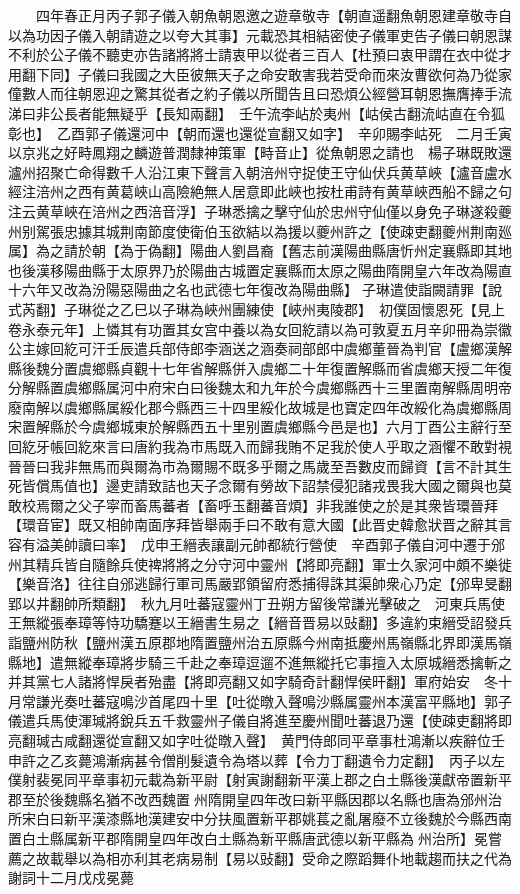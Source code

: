 　　四年春正月丙子郭子儀入朝魚朝恩邀之遊章敬寺【朝直遥翻魚朝恩建章敬寺自以為功因子儀入朝請遊之以夸大其事】元載恐其相結密使子儀軍吏告子儀曰朝恩謀不利於公子儀不聽吏亦告諸將將士請衷甲以從者三百人【杜預曰衷甲謂在衣中從才用翻下同】子儀曰我國之大臣彼無天子之命安敢害我若受命而來汝曹欲何為乃從家僮數人而往朝恩迎之驚其從者之約子儀以所聞告且曰恐煩公經營耳朝恩撫膺捧手流涕曰非公長者能無疑乎【長知兩翻】　壬午流李岾於夷州【岵侯古翻流岵直在令狐彰也】　乙酉郭子儀還河中【朝而還也還從宣翻又如字】　辛卯賜李岵死　二月壬寅以京兆之好畤鳳翔之麟遊普潤隸神策軍【畤音止】從魚朝恩之請也　楊子琳既敗還瀘州招聚亡命得數千人沿江東下聲言入朝涪州守捉使王守仙伏兵黄草峽【瀘音盧水經注涪州之西有黄葛峽山高險絶無人居意即此峽也按杜甫詩有黄草峽西船不歸之句注云黄草峽在涪州之西涪音浮】子琳悉擒之擊守仙於忠州守仙僅以身免子琳遂殺夔州别駕張忠據其城荆南節度使衛伯玉欲結以為援以夔州許之【使疎吏翻夔州荆南廵属】為之請於朝【為于偽翻】陽曲人劉昌裔【舊志前漢陽曲縣唐忻州定襄縣即其地也後漢移陽曲縣于太原界乃於陽曲古城置定襄縣而太原之陽曲隋開皇六年改為陽直十六年又改為汾陽惡陽曲之名也武德七年復改為陽曲縣】子琳遣使詣闕請罪【說式芮翻】子琳從之乙巳以子琳為峽州團練使【峽州夷陵郡】　初僕固懷恩死【見上卷永泰元年】上憐其有功置其女宫中養以為女回紇請以為可敦夏五月辛卯冊為崇徽公主嫁回紇可汗壬辰遣兵部侍郎李涵送之涵奏祠部郎中虞鄉董晉為判官【盧鄉漢解縣後魏分置虞鄉縣貞觀十七年省解縣併入虞鄉二十年復置解縣而省虞鄉天授二年復分解縣置虞鄉縣属河中府宋白曰後魏太和九年於今虞鄉縣西十三里置南解縣周明帝廢南解以虞鄉縣属綏化郡今縣西三十四里綏化故城是也寶定四年改綏化為虞鄉縣周宋置解縣於今虞鄉城東於解縣西五十里别置虞鄉縣今邑是也】六月丁酉公主辭行至回紇牙帳回紇來言曰唐約我為市馬既入而歸我賄不足我於使人乎取之涵懼不敢對視晉晉曰我非無馬而與爾為市為爾賜不既多乎爾之馬歲至吾數皮而歸資【言不計其生死皆償馬值也】邊吏請致詰也天子念爾有勞故下詔禁侵犯諸戎畏我大國之爾與也莫敢校焉爾之父子寜而畜馬蕃者【畜呼玉翻蕃音煩】非我誰使之於是其衆皆環晉拜【環音宦】既又相帥南面序拜皆舉兩手曰不敢有意大國【此晋史韓愈狀晋之辭其言容有溢美帥讀曰率】　戊申王縉表讓副元帥都統行營使　辛酉郭子儀自河中遷于邠州其精兵皆自隨餘兵使禆將將之分守河中靈州【將即亮翻】軍士久家河中頗不樂徙【樂音洛】往往自邠逃歸行軍司馬嚴郢領留府悉捕得誅其渠帥衆心乃定【邠卑旻翻郢以井翻帥所類翻】　秋九月吐蕃寇靈州丁丑朔方留後常謙光擊破之　河東兵馬使王無縱張奉璋等恃功驕蹇以王縉書生易之【縉音晋易以䜴翻】多違約束縉受詔發兵詣鹽州防秋【鹽州漢五原郡地隋置鹽州治五原縣今州南抵慶州馬嶺縣北界即漢馬嶺縣地】遣無縱奉璋將步騎三千赴之奉璋逗遛不進無縱托它事擅入太原城縉悉擒斬之并其黨七人諸將悍戾者殆盡【將即亮翻又如字騎奇計翻悍侯旰翻】軍府始安　冬十月常謙光奏吐蕃寇鳴沙首尾四十里【吐從暾入聲鳴沙縣属靈州本漢富平縣地】郭子儀遣兵馬使渾瑊將銳兵五千救靈州子儀自將進至慶州聞吐蕃退乃還【使疎吏翻將即亮翻瑊古咸翻還從宣翻又如字吐從暾入聲】　黄門侍郎同平章事杜鴻漸以疾辭位壬申許之乙亥薨鴻漸病甚令僧削髮遺令為塔以葬【令力丁翻遺令力定翻】　丙子以左僕射裴冕同平章事初元載為新平尉【射寅謝翻新平漢上郡之白土縣後漢獻帝置新平郡至於後魏縣名猶不改西魏置州隋開皇四年改曰新平縣因郡以名縣也唐為邠州治所宋白曰新平漢漆縣地漢建安中分扶風置新平郡姚萇之亂屠廢不立後魏於今縣西南置白土縣属新平郡隋開皇四年改白土縣為新平縣唐武德以新平縣為州治所】冕嘗薦之故載舉以為相亦利其老病易制【易以䜴翻】受命之際蹈舞仆地載趨而扶之代為謝詞十二月戊戍冕薨

